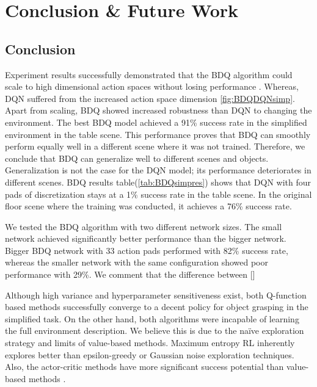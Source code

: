
\chapter{Conclusion \& Future Work}\label{chapter:conclusion}

\section{Conclusion}


Experiment results successfully demonstrated that the BDQ algorithm could scale to high dimensional action spaces without losing performance \cite{Tavakoli2018}. Whereas, DQN suffered from the increased action space dimension \ref{fig:BDQDQNsimp}. Apart from scaling, BDQ showed increased robustness than DQN to changing the environment. The best BDQ model achieved a 91\% success rate in the simplified environment in the table scene. This performance proves that BDQ can smoothly perform equally well in a different scene where it was not trained. Therefore, we conclude that BDQ can generalize well to different scenes and objects. Generalization is not the case for the DQN model; its performance deteriorates in different scenes. BDQ results table(\ref{tab:BDQsimpres}) shows that DQN with four pads of discretization stays at a 1\% success rate in the table scene. In the original floor scene where the training was conducted, it achieves a 76\% success rate.

We tested the BDQ algorithm with two different network sizes. The small network achieved significantly better performance than the bigger network. Bigger BDQ network with 33 action pads performed with 82\% success rate, whereas the smaller network with the same configuration showed poor performance with 29\%. We comment that the difference between []

Although high variance and hyperparameter sensitiveness exist, both Q-function based methods successfully converge to a decent policy for object grasping in the simplified task. On the other hand, both algorithms were incapable of learning the full environment description. We believe this is due to the naïve exploration strategy and limits of value-based methods. Maximum entropy RL inherently explores better than epsilon-greedy or Gaussian noise exploration techniques. Also, the actor-critic methods have more significant success potential than value-based methods \cite{Lillicrap2016}. 

